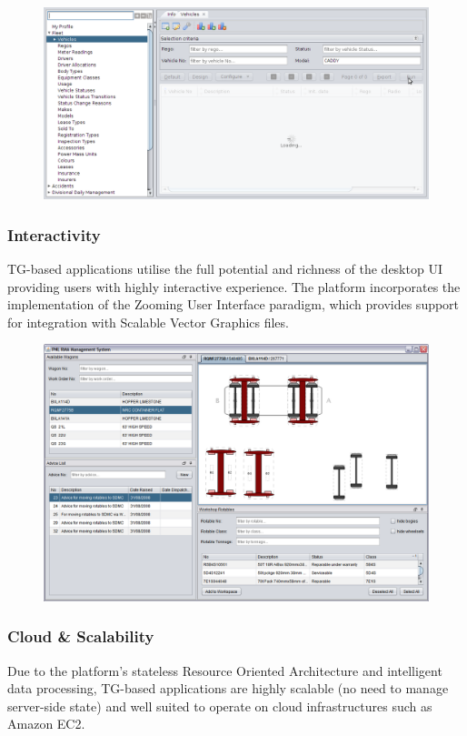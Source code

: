 \documentclass[a4paper,12pt,twocolumn,oneside,openright,final]{memoir}
\begin{document}
  \begin{figure}[!h]
  \centering
  \includegraphics[scale=0.2]{images/03-running.png}
  \end{figure}

\subsubsection*{Interactivity}
  TG-based applications utilise the full potential and richness of the desktop UI providing users with highly interactive experience.
  The platform incorporates the implementation of the Zooming User Interface paradigm, which provides support for integration with Scalable Vector Graphics files.

  \begin{figure}[!h]
  \centering
  \includegraphics[scale=0.18]{images/02-workspace-custom-layout.png}
  \end{figure}

\subsubsection*{Cloud \& Scalability}
  Due to the platform's stateless Resource Oriented Architecture and intelligent data processing, TG-based applications are highly scalable (no need to manage server-side state) and well suited to operate on cloud infrastructures such as Amazon EC2.
\end{document}
